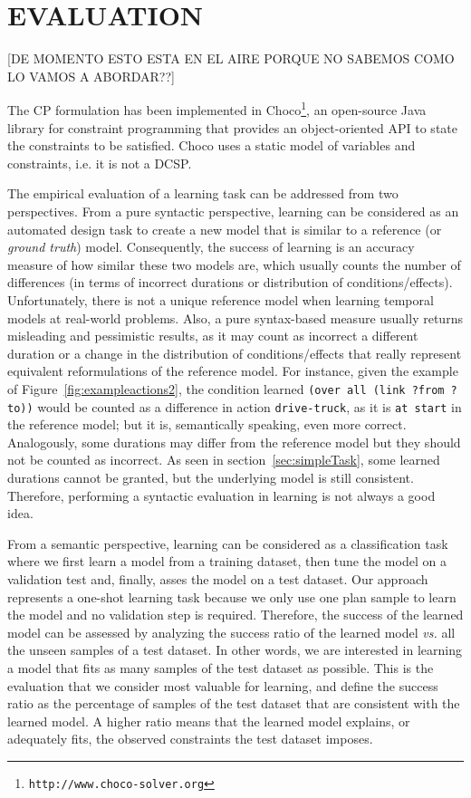 \documentclass{ecai}
\begin{document}
  
\section{EVALUATION}
\label{sec:evaluation}

[DE MOMENTO ESTO ESTA EN EL AIRE PORQUE NO SABEMOS COMO LO VAMOS A ABORDAR??]

The CP formulation has been implemented in \textsf{Choco}\footnote{\texttt{http://www.choco-solver.org}}, an open-source Java library for constraint programming that provides an object-oriented API to state the constraints to be satisfied. \textsf{Choco} uses a static model of variables and constraints, i.e. it is not a DCSP.

The empirical evaluation of a learning task can be addressed from two perspectives. From a pure syntactic perspective, learning can be considered as an automated design task to create a new model that is similar to a reference (or {\em ground truth}) model. Consequently, the success of learning is an accuracy measure of how similar these two models are, which usually counts the number of differences (in terms of incorrect durations or distribution of conditions/effects). Unfortunately, there is not a unique reference model when learning temporal models at real-world problems. Also, a pure syntax-based measure usually returns misleading and pessimistic results, as it may count as incorrect a different duration or a change in the distribution of conditions/effects that really represent equivalent reformulations of the reference model. For instance, given the example of Figure~\ref{fig:exampleactions2}, the condition learned \texttt{(over all (link ?from ?to))} would be counted as a difference in action \texttt{drive-truck}, as it is \texttt{at start} in the reference model; but it is, semantically speaking, even more correct. Analogously, some durations may differ from the reference model but they should not be counted as incorrect. As seen in section~\ref{sec:simpleTask}, some learned durations cannot be granted, but the underlying model is still consistent. Therefore, performing a syntactic evaluation in learning is not always a good idea.

From a semantic perspective, learning can be considered as a classification task where we first learn a model from a training dataset, then tune the model on a validation test and, finally, asses the model on a test dataset. Our approach represents a one-shot learning task because we only use one plan sample to learn the model and no validation step is required.
Therefore, the success of the learned model can be assessed by analyzing the success ratio of the learned model \emph{vs.} all the unseen samples of a test dataset. In other words, we are interested in learning a model that fits as many samples of the test dataset as possible. This is the evaluation that we consider most valuable for learning, and define the success ratio as the percentage of samples of the test dataset that are consistent with the learned model. A higher ratio means that the learned model explains, or adequately fits, the observed constraints the test dataset imposes.
\end{document}
